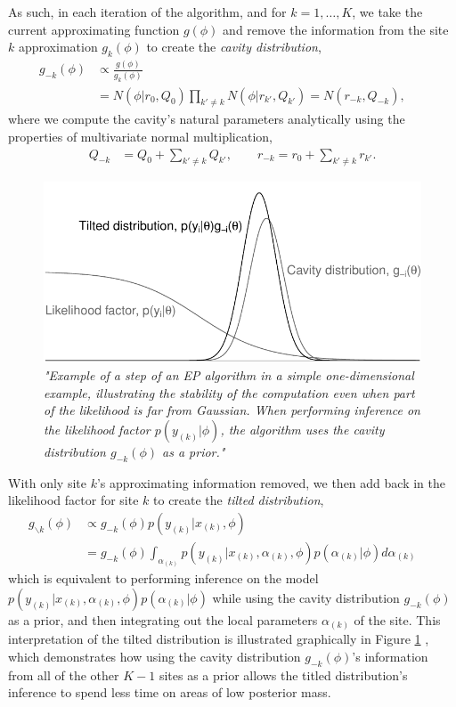 As such, in each iteration of the algorithm, and for $k=1,\ldots,K$, we take the current approximating function $g(\phi)$ and remove the information from the site $k$ approximation $g_k(\phi)$ to create the \emph{cavity distribution},
\begin{align}
g_{-k}(\phi) 
&\propto \frac{g(\phi)}{g_k(\phi)} && \\\nonumber
&=  N(\phi | r_0, Q_0) \prod_{k' \neq k} N(\phi | r_{k'} , Q_{k'}) = N( r_{-k}, Q_{-k}),
\end{align}
where we compute the cavity's natural parameters analytically using the properties of multivariate normal multiplication,
\begin{align}
Q_{-k} 
&= Q_0 + \sum_{k' \neq k} Q_{k'}, \qquad
r_{-k} 
= r_0 + \sum_{k' \neq k} r_{k'}.
\end{align}

\begin{figure}
\centerline{\includegraphics[width=.6\textwidth]{figures/separation.pdf}}
\caption{\em "Example of a step of an EP algorithm in a simple one-dimensional example, illustrating the stability of the computation even when part of the likelihood is far from Gaussian.  When performing inference on the likelihood factor $p(y_{(k)} | \phi)$, the algorithm uses the cavity distribution $g_{-k}(\phi)$ as a prior."}\label{fig:ep_tilted}
\end{figure}

With only site $k$'s approximating information removed, we then add back in the likelihood factor for site $k$ to create the \emph{tilted distribution},
\begin{align}
g_{\backslash k} (\phi) 
&\propto g_{-k}(\phi) p(y_{(k)} | x_{(k)}, \phi) 
&& \label{eq:ep_tilted}
\\\nonumber
&= g_{-k}(\phi) \int_{\alpha_{(k)}} p(y_{(k)} | x_{(k)}, \alpha_{(k)}, \phi) p(\alpha_{(k)} | \phi) d\alpha_{(k)}
\end{align}
which is equivalent to performing inference on the model $p(y_{(k)} | x_{(k)}, \alpha_{(k)}, \phi) p(\alpha_{(k)} | \phi)$ while using the cavity distribution $g_{-k}(\phi)$ as a prior, and then integrating out the local parameters $\alpha_{(k)}$ of the site. This interpretation of the tilted distribution is illustrated graphically in Figure \ref{fig:ep_tilted} \citep{Gelman+others:2017}, which demonstrates how using the cavity distribution $g_{-k}(\phi)$'s information from all of the other $K-1$ sites as a prior allows the titled distribution's inference to spend less time on areas of low posterior mass.

